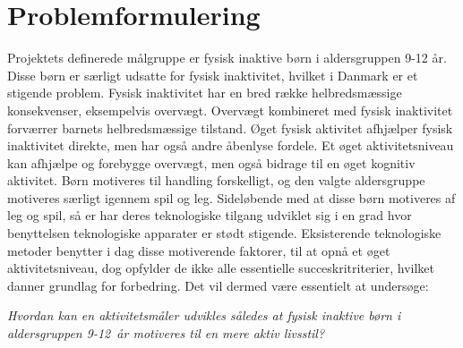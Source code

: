 \newpage \section{Problemformulering} 
Projektets definerede målgruppe er fysisk inaktive børn i aldersgruppen 9-12 år. Disse børn er særligt udsatte for fysisk inaktivitet, hvilket i Danmark er et stigende problem. Fysisk inaktivitet har en bred række helbredsmæssige konsekvenser, eksempelvis overvægt. Overvægt kombineret med fysisk inaktivitet forværrer barnets helbredsmæssige tilstand. Øget fysisk aktivitet afhjælper fysisk inaktivitet direkte, men har også andre åbenlyse fordele. Et øget aktivitetsniveau kan afhjælpe og forebygge overvægt, men også bidrage til en øget kognitiv aktivitet. Børn motiveres til handling forskelligt, og den valgte aldersgruppe motiveres særligt igennem spil og leg. Sideløbende med at disse børn motiveres af leg og spil, så er har deres teknologiske tilgang udviklet sig i en grad hvor benyttelsen teknologiske apparater er stødt stigende. Eksisterende teknologiske metoder benytter i dag disse motiverende faktorer, til at opnå et øget aktivitetsniveau, dog opfylder de ikke alle essentielle succeskritriterier, hvilket danner grundlag for forbedring. Det vil dermed være essentielt at undersøge:

\begin{center}
\textit{Hvordan kan en aktivitetsmåler udvikles således at fysisk inaktive børn i aldersgruppen 9-12~år motiveres til en mere aktiv livsstil?}
\end{center}


%
%	

